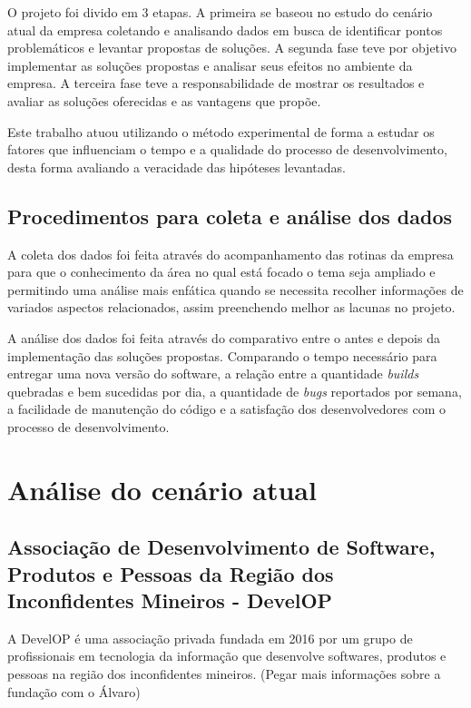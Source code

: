 \documentclass[
	12pt,				%
	openright,			%
	twoside,			%
	a4paper,			%
	english,			%
	french,				%
	spanish,			%
	brazil,				%
	]{abntex2}
\begin{document}
O projeto foi divido em 3 etapas. A primeira se baseou no estudo do cenário atual da empresa coletando e analisando dados em busca de identificar pontos problemáticos e levantar propostas de soluções. A segunda fase teve por objetivo implementar as soluções propostas e analisar seus efeitos no ambiente da empresa. A terceira fase teve a responsabilidade de mostrar os resultados e avaliar as soluções oferecidas e as vantagens que propõe.

Este trabalho atuou utilizando o método experimental de forma a estudar os fatores que influenciam o tempo e a qualidade do processo de desenvolvimento, desta forma avaliando a veracidade das hipóteses levantadas.

\section{Procedimentos para coleta e análise dos dados}

A coleta dos dados foi feita através do acompanhamento das rotinas da empresa para que o conhecimento da área no qual está focado o tema seja ampliado e permitindo uma análise mais enfática quando se necessita recolher informações de variados aspectos relacionados, assim preenchendo melhor as lacunas no projeto.

A análise dos dados foi feita através do comparativo entre o antes e depois da implementação das soluções propostas. Comparando o tempo necessário para entregar uma nova versão do software, a relação entre a quantidade \textit{builds} quebradas e bem sucedidas por dia, a quantidade de  \textit{bugs} reportados por semana, a facilidade de manutenção do código e a satisfação dos desenvolvedores com o processo de desenvolvimento.


\chapter{Análise do cenário atual}

\section{Associação de Desenvolvimento de Software, Produtos e Pessoas da Região dos Inconfidentes Mineiros - DevelOP}

A DevelOP é uma associação privada fundada em 2016 por um grupo de profissionais em tecnologia da informação que desenvolve softwares, produtos e pessoas na região dos inconfidentes mineiros. (Pegar mais informações sobre a fundação com o Álvaro)
\end{document}
